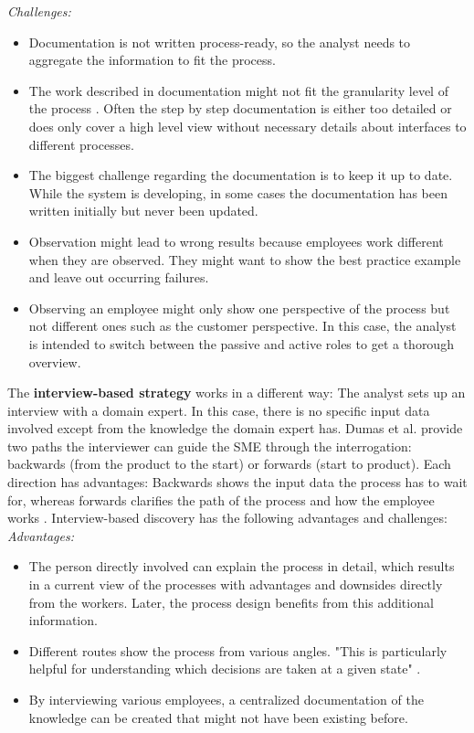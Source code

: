 \textit{Challenges:}
\begin{itemize}
\item Documentation is not written process-ready, so the analyst needs to aggregate the information to fit the process. 
\item The work described in documentation might not fit the granularity level of the process \cite{Dumas2013}. Often the step by step documentation is either too detailed or does only cover a high level view without necessary details about interfaces to different processes. 
\item The biggest challenge regarding the documentation is to keep it up to date. While the system is developing, in some cases the documentation has been written initially but never been updated. 
\item Observation might lead to wrong results because employees work different when they are observed. They might want to show the best practice example and leave out occurring failures. 
\item Observing an employee might only show one perspective of the process but not different ones such as the customer perspective. In this case, the analyst is intended to switch between the passive and active roles to get a thorough overview. 
\end{itemize}

The \textbf{interview-based strategy} works in a different way: The analyst sets up an interview with a domain expert. In this case, there is no specific input data involved except from the knowledge the domain expert has. Dumas et al. provide two paths the interviewer can guide the SME through the interrogation: backwards (from the product to the start) or forwards (start to product). Each direction has advantages: Backwards shows the input data the process has to wait for, whereas forwards clarifies the path of the process and how the employee works \cite{Dumas2013}. Interview-based discovery has the following advantages and challenges: \\

\textit{Advantages:}
\begin{itemize}
\item The person directly involved can explain the process in detail, which results in a current view of the processes with advantages and downsides directly from the workers. Later, the process design benefits from this additional information.
\item Different routes show the process from various angles. "This is particularly helpful for understanding which decisions are taken at a given state" \cite{Dumas2013}.
\item By interviewing various employees, a centralized documentation of the knowledge can be created that might not have been existing before.
\end{itemize}

